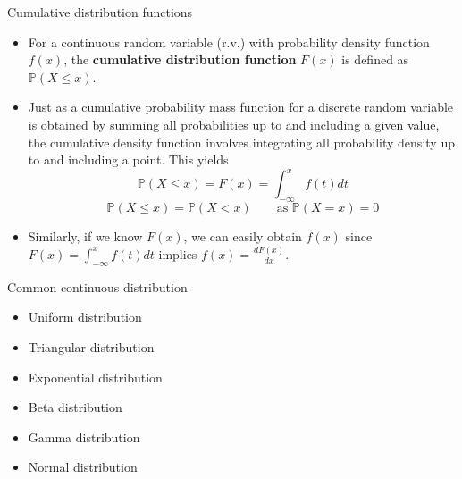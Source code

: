 \documentclass[ignorenonframetext,]{beamer}
\begin{document}
\begin{frame}{Cumulative distribution functions}

\begin{itemize}
\item
  For a continuous random variable (r.v.) with probability density
  function \(f(x)\), the \textbf{cumulative distribution function}
  \(F(x)\) is defined as \(\mathbb{P}(X\le x)\).
\item
  Just as a cumulative probability mass function for a discrete random
  variable is obtained by summing all probabilities up to and including
  a given value, the cumulative density function involves integrating
  all probability density up to and including a point. This yields
  \[\mathbb{P}(X\le x)=F(x)=\int^x_{-\infty}f(t)dt\]
  \[\mathbb{P}(X\le x)=\mathbb{P}(X<x)\qquad\text{as}\,\,\mathbb{P}(X=x)=0\]
\item
  Similarly, if we know \(F(x)\), we can easily obtain \(f(x)\) since
  \(F(x)=\int^x_{-\infty}f(t)dt\) implies \(f(x)=\frac{dF(x)}{dx}\).
\end{itemize}

\end{frame}

\begin{frame}{Common continuous distribution}

\begin{itemize}
\item
  Uniform distribution
\item
  Triangular distribution
\item
  Exponential distribution
\item
  Beta distribution
\item
  Gamma distribution
\item
  Normal distribution
\end{itemize}

\end{frame}
\end{document}
